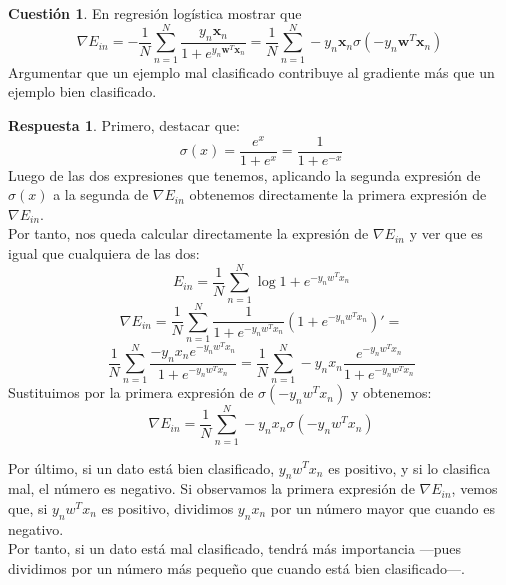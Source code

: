 \documentclass[10pt,a4paper]{article}
\theoremstyle{definition}
\newtheorem{cuestion}{Cuestión}
\newtheorem*{respuesta}{Respuesta}
\begin{document}
\begin{cuestion}
En regresión logística mostrar que 
\[
	\nabla E_{in} = -\frac{1}{N}\sum_{n=1}^N\frac{y_n\mathbf{x}_n}{1+e^{y_n\mathbf{w}^T\mathbf{x}_n}} = \frac{1}{N}\sum_{n=1}^N-y_n\mathbf{x}_n\sigma(-y_n\mathbf{w}^T\mathbf{x}_n)
\]
Argumentar que un ejemplo mal clasificado contribuye al gradiente más que un ejemplo bien clasificado.
\end{cuestion}
\begin{respuesta}

Primero, destacar que:
\[
\ \sigma(x) = \frac{e^x}{1+e^x} = \frac{1}{1+e^{-x}}
\]
Luego de las dos expresiones que tenemos, aplicando la segunda expresión de $\sigma(x)$ a la segunda de $\nabla E_{in}$ obtenemos directamente la primera expresión de $\nabla E_{in}$.\\

Por tanto, nos queda calcular directamente la expresión de $\nabla E_{in}$ y ver que es igual que cualquiera de las dos:
\[
\ E_{in} = \frac{1}{N} \sum_{n=1}^N \log{1+e^{-y_nw^Tx_n}}
\]
\[
\ \nabla E_{in} = \frac{1}{N} \sum_{n=1}^N \frac{1}{1+e^{-y_nw^Tx_n}}\left(1+e^{-y_nw^Tx_n}\right)' = 
\]
\[
\ \frac{1}{N} \sum_{n=1}^N \frac{-y_nx_ne^{-y_nw^Tx_n}}{1+e^{-y_nw^Tx_n}} = \frac{1}{N} \sum_{n=1}^N -y_nx_n\frac{e^{-y_nw^Tx_n}}{1+e^{-y_nw^Tx_n}} 
\]
Sustituimos por la primera expresión de $\sigma(-y_nw^Tx_n)$ y obtenemos:
\[
\ \nabla E_{in} = \frac{1}{N} \sum_{n=1}^N -y_nx_n\sigma(-y_nw^Tx_n)
\]

Por último, si un dato está bien clasificado, $y_nw^Tx_n$ es positivo, y si lo clasifica mal, el número es negativo. Si observamos la primera expresión de $\nabla E_{in}$, vemos que, si $y_nw^Tx_n$ es positivo, dividimos $y_nx_n$ por un número mayor que cuando es negativo.\\

Por tanto, si un dato está mal clasificado, tendrá más importancia ---pues dividimos por un número más pequeño que cuando está bien clasificado---.
\end{respuesta}
\end{document}
